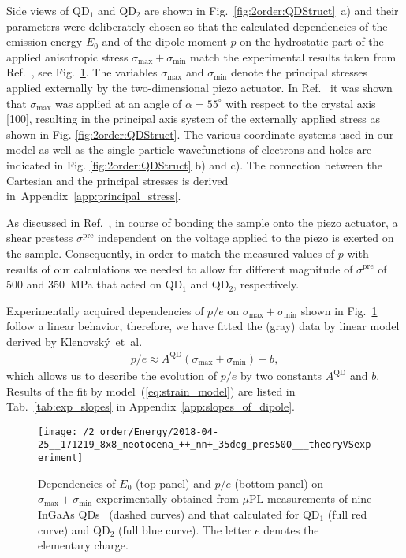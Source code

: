 Side views of QD$_1$ and QD$_2$ are shown in Fig.~\ref{fig:2order:QDStruct}~a) and their parameters were deliberately chosen so that the calculated dependencies of the emission energy $E_0$ and of the dipole moment $p$ on the hydrostatic part of the applied anisotropic stress $\sigma_{\mathrm{max}}+\sigma_{\mathrm{min}}$ match the experimental results taken from Ref.~\cite{Aberl:17}, see Fig.~\ref{fig:TheorVsExp}. The variables $\sigma_{\mathrm{max}}$ and $\sigma_{\mathrm{min}}$ denote the principal stresses~\cite{Trotta:15} applied externally by the two-dimensional piezo actuator. In  Ref.~\citep{Aberl:17} it was shown that $\sigma_{\mathrm{max}}$ was applied at an angle of $\alpha=55^{\circ}$ with respect to the crystal axis [100], resulting in the principal axis system of the externally applied stress as shown in Fig. \ref{fig:2order:QDStruct}. The various coordinate systems used in our model as well as the single-particle wavefunctions of electrons and holes are indicated in Fig. \ref{fig:2order:QDStruct} b) and c). The connection between the Cartesian and the principal stresses is derived in~Appendix~\ref{app:principal_stress}.

As discussed in Ref.~\cite{Aberl:17}, in course of bonding the sample onto the piezo actuator, a shear prestess $\sigma^\text{pre}$ independent on the voltage applied to the piezo is exerted on the sample. Consequently, in order to match the measured values of $p$ with results of our calculations we needed to allow for different magnitude of $\sigma^\text{pre}$ of 500 and 350~MPa that acted on QD$_1$ and QD$_2$, respectively.

Experimentally acquired dependencies of $p/e$ on $\sigma_{\mathrm{max}}+\sigma_{\mathrm{min}}$ shown in Fig.~\ref{fig:TheorVsExp} follow a linear behavior, therefore, we have fitted the (gray) data by linear model derived by Klenovský~et~al.~\cite{Klenovsky_2018_InGaAs_straintuned}
%
\begin{eqnarray}
p/e\approx A^{\mathrm{QD}}\left(\sigma_\mathrm{max}+\sigma_\mathrm{min}\right)+b, \label{eq:strain_model}
\end{eqnarray}
%
which allows us to describe the evolution of $p/e$ by two constants $A^{\mathrm{QD}}$ and $b$. Results of the fit by model~(\ref{eq:strain_model}) are listed in Tab.~\ref{tab:exp_slopes} in Appendix~\ref{app:slopes_of_dipole}.

%


\begin{figure}[!ht]
	\centering
	\renewcommand{\tabcolsep}{2pt}
	\texttt{[image: /2\_order/Energy/2018-04-25\_\_171219\_8x8\_neotocena\_++\_nn+\_35deg\_pres500\_\_\_theoryVSexperiment]} 
	\caption{
		Dependencies of $E_0$ (top panel) and $p/e$ (bottom panel) on $\sigma_{\mathrm{max}}+\sigma_{\mathrm{min}}$ experimentally obtained from $\mu$PL measurements of nine InGaAs QDs~\cite{Aberl:17} (dashed curves) and that calculated for QD$_1$ (full red curve) and QD$_2$ (full blue curve). The letter $e$ denotes the elementary charge.}
	\label{fig:TheorVsExp}
\end{figure}

